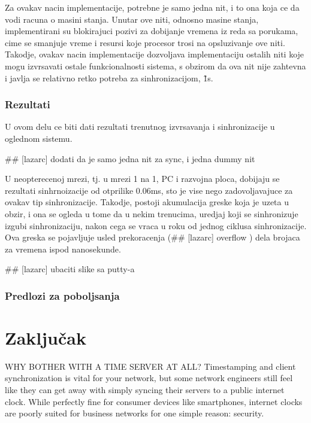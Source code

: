 \documentclass[a4paper,12pt, master]{etf}
\begin{document}
        Za ovakav nacin implementacije, potrebne je samo jedna nit, i to ona koja ce da vodi racuna o masini
        stanja. Unutar ove niti, odnosno masine stanja, implementirani su blokirajuci pozivi za dobijanje vremena
        iz reda sa porukama, cime se smanjuje vreme i resursi koje procesor trosi na opsluzivanje ove niti.
        Takodje, ovakav nacin implementacije dozvoljava implementaciju ostalih niti koje mogu izvrsavati ostale
        funkcionalnosti sistema, s obzirom da ova nit nije zahtevna i javlja se relativno retko potreba za
        sinhronizacijom, \~1s.

        \subsection{Rezultati}

        U ovom delu ce biti dati rezultati trenutnog izvrsavanja i sinhronizacije u oglednom sistemu.

        \#\# [lazarc] dodati da je samo jedna nit za sync, i jedna dummy nit

        U neopterecenoj mrezi, tj\@. u mrezi 1 na 1, PC i razvojna ploca, dobijaju se rezultati sinhrnoizacije od
        otprilike 0.06ms, sto je vise nego zadovoljavajuce za ovakav tip sinhronizacije. Takodje, postoji
        akumulacija greske koja je uzeta u obzir, i ona se ogleda u tome da u nekim trenucima, uredjaj koji se
        sinhronizuje izgubi sinhronizaciju, nakon cega se vraca u roku od jednog ciklusa sinhronizacije. Ova
        greska se pojavljuje usled prekoracenja (\#\# [lazarc] overflow ) dela brojaca za vremena ispod
        nanosekunde.

        \#\# [lazarc] ubaciti slike sa putty-a

        \subsection{Predlozi za poboljsanja}

	\newpage

	\chapter{Zaključak}

	WHY BOTHER WITH A TIME SERVER AT ALL\@?
	Timestamping and client synchronization is vital for your network, but some network
	engineers still feel like they can get away with simply syncing their servers to a public
	internet clock. While perfectly fine for consumer devices like smartphones, internet
	clocks are poorly suited for business networks for one simple reason: security.
\end{document}
